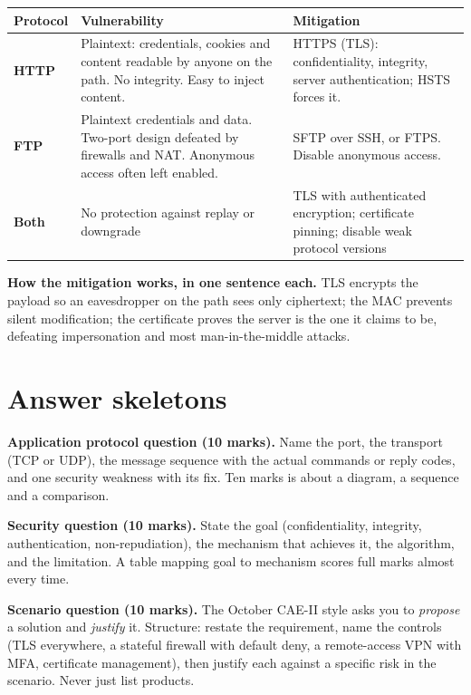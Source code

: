 \documentclass[11pt,a4paper]{article}
\begin{document}
\begin{solbox}
\begin{center}\small
\begin{tabularx}{\textwidth}{>{\bfseries}p{} X X}
\toprule Protocol & Vulnerability & Mitigation\\
\midrule
HTTP & Plaintext: credentials, cookies and content readable by anyone on the path. No integrity. Easy to inject content. & HTTPS (TLS): confidentiality, integrity, server authentication; HSTS forces it.\\
FTP & Plaintext credentials and data. Two-port design defeated by firewalls and NAT. Anonymous access often left enabled. & SFTP over SSH, or FTPS. Disable anonymous access.\\
Both & No protection against replay or downgrade & TLS with authenticated encryption; certificate pinning; disable weak protocol versions\\
\bottomrule
\end{tabularx}
\end{center}

\textbf{How the mitigation works, in one sentence each.} TLS encrypts the payload so an eavesdropper on the path sees only ciphertext; the MAC prevents silent modification; the certificate proves the server is the one it claims to be, defeating impersonation and most man-in-the-middle attacks.
\end{solbox}

\section{Answer skeletons}

\begin{answerbox}
\textbf{Application protocol question (10 marks).} Name the port, the transport (TCP or UDP), the message sequence with the actual commands or reply codes, and one security weakness with its fix. Ten marks is about a diagram, a sequence and a comparison.
\end{answerbox}

\begin{answerbox}
\textbf{Security question (10 marks).} State the goal (confidentiality, integrity, authentication, non-repudiation), the mechanism that achieves it, the algorithm, and the limitation. A table mapping goal to mechanism scores full marks almost every time.
\end{answerbox}

\begin{answerbox}
\textbf{Scenario question (10 marks).} The October CAE-II style asks you to \emph{propose} a solution and \emph{justify} it. Structure: restate the requirement, name the controls (TLS everywhere, a stateful firewall with default deny, a remote-access VPN with MFA, certificate management), then justify each against a specific risk in the scenario. Never just list products.
\end{answerbox}
\end{document}

